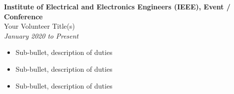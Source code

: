 \bigbreak
\noindent
\textbf{Institute of Electrical and Electronics Engineers (IEEE), Event / Conference}\\
Your Volunteer Title(s)\\
\textit{January 2020 to Present}
\begin{itemize}
    \item Sub-bullet, description of duties
    \item Sub-bullet, description of duties
    \item Sub-bullet, description of duties
\end{itemize}